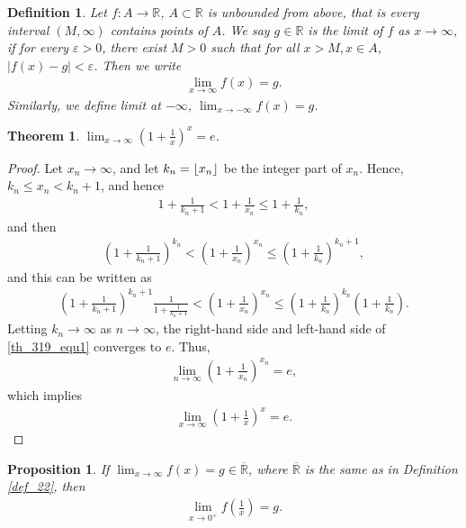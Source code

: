 \documentclass[11pt]{book}
\DeclarePairedDelimiter\floor{\lfloor}{\rfloor}
\newtheorem{definition}{Definition}[chapter]
\newtheorem{theorem}{Theorem}[chapter]
\newtheorem{proposition}{Proposition}[chapter]
\theoremstyle{definition}
\numberwithin{equation}{chapter}
\begin{document}
\medskip

\begin{definition}
Let $f: A \to \mathbb{R}$, $A \subset \mathbb{R}$ is unbounded from above, that is every interval $(M, \infty)$ contains points of $A$. We say $g \in \mathbb{R}$ is the limit of $f$ as $x \to \infty$, if for every $\varepsilon > 0$, there exist $M > 0$ such that for all $x > M, x \in A$, $\left|f(x) - g\right| < \varepsilon$. Then we write
\begin{align*}
    \lim_{x \to \infty} f(x) = g.
\end{align*}
Similarly, we define limit at $-\infty$, $\lim_{x \to -\infty} f(x) = g$. 
\end{definition}

\medskip

\begin{theorem}\label{th_319}
$\lim_{x\to\infty} \displaystyle \left(1 + \frac{1}{x}\right)^x = e$.
\end{theorem}
\begin{proof}
Let $x_n \to \infty$, and let $k_n = \floor*{x_n}$ be the integer part of $x_n$. Hence, $k_n \leq x_n < k_n + 1$, and hence
\begin{align*}
    1 + \frac{1}{k_n + 1} < 1 + \frac{1}{x_n} \leq 1 + \frac{1}{k_n},
\end{align*}
and then 
\begin{align*}
    \left(1 + \frac{1}{k_n + 1}\right)^{k_n} < \left(1 + \frac{1}{x_n}\right)^{x_n} \leq \left(1 + \frac{1}{k_n}\right)^{k_n+1},
\end{align*}
and this can be written as
\begin{align}\label{th_319_equ1}
    \left(1 + \frac{1}{k_n + 1}\right)^{k_n+1} \frac{1}{1 + \frac{1}{k_n + 1}} < \left(1 + \frac{1}{x_n}\right)^{x_n} \leq \left(1 + \frac{1}{k_n}\right)^{k_n} \left(1 + \frac{1}{k_n}\right).
\end{align}
Letting $k_n \to \infty$ as $n \to \infty$, the right-hand side and left-hand side of \eqref{th_319_equ1} converges to $e$. Thus,
\begin{align*}
    \lim_{n\to\infty} \left(1 + \frac{1}{x_n}\right)^{x_n} = e,
\end{align*}
which implies
\begin{align*}
    \lim_{x\to\infty} \left(1 + \frac{1}{x}\right)^{x} = e.
\end{align*}
\end{proof}

\medskip

\begin{proposition}\label{prop_31}
If $\lim_{x\to\infty} f(x) = g \in \overline{\mathbb{R}}$, where $\overline{\mathbb{R}}$ is the same as in Definition \ref{def_22}, then
\begin{align*}
    \lim_{x \to 0^+} f\left(\frac{1}{x}\right) = g.
\end{align*}
\end{proposition}
\end{document}
